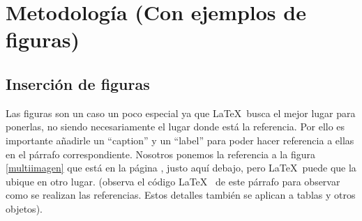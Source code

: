 \chapter{Metodología (Con ejemplos de figuras)}
\label{metodologia}

\section{Inserción de figuras}

Las figuras son un caso un poco especial ya que \LaTeX~busca el mejor lugar para ponerlas, no siendo necesariamente el lugar donde está la referencia. Por ello es importante añadirle un ``caption'' y un ``label'' para poder hacer referencia a ellas en el párrafo correspondiente. Nosotros ponemos la referencia a la figura \ref{multiimagen} que está en la página \pageref{multiimagen}, justo aquí debajo, pero \LaTeX ~puede que la ubique en otro lugar. (observa el código \LaTeX~ de este párrafo para observar como se realizan las referencias. Estos detalles también se aplican a tablas y otros objetos).

